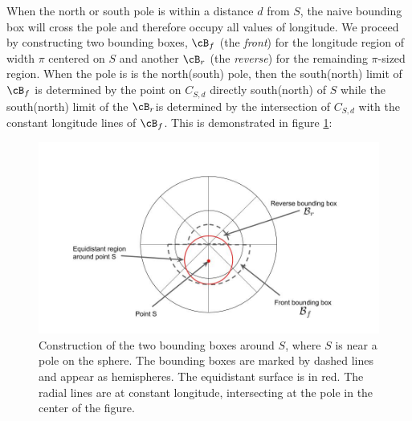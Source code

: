 \documentclass[preprint,12pt]{article}
\begin{document}
When the north or south pole is within a distance $d$ from $S$, the naive bounding box will cross the pole and therefore occupy all values of longitude. We proceed by constructing two bounding boxes, $\cB_f$ (the {\it front}) for the longitude region of width $\pi$ centered on $S$ and another $\cB_r$ (the {\it reverse}) for the remainding $\pi$-sized region. When the pole is is the north(south) pole, then the south(north) limit of $\cB_f$ is determined by the point on $C_{S,d}$ directly south(north) of $S$ while the south(north) limit of the $\cB_r$is determined by the intersection of $C_{S,d}$ with the constant longitude lines of $\cB_f$. This is demonstrated in figure \ref{fig:bbox_reverse}:
\begin{figure}[bth!]
  \includegraphics[width=\linewidth]{bbox_reverse}
  \caption{Construction of the two bounding boxes around $S$, where $S$ is near a pole on the sphere. The bounding boxes are marked by dashed lines and appear as hemispheres.  The equidistant surface is in red. The radial lines are at constant longitude, intersecting at the pole in the center of the figure.}
  \label{fig:bbox_reverse}
\end{figure}

 


\end{document}
